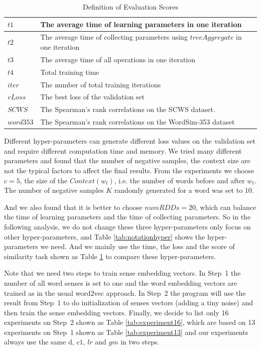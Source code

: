 \begin{table}[tb]
	\caption{Definition of Evaluation Scores } \label{tab:notationevalution}
	\begin{center}
		\begin{tabular}{|l|l|}
			\hline 
			$t1$ & The average time of learning parameters in one iteration  \\ \hline
			$t2$ & The average time of collecting parameters using $treeAggregate$ in one iteration \\ \hline
			
			$t3$ &The average time of all operations in one iteration \\ \hline
			
			$t4$ & Total training time \\ \hline
			$iter$ & The number of total training iterations \\ \hline
			$vLoss$ & The best loss of the validation set \\ \hline
			$SCWS$ & The Spearman’s rank correlations on the SCWS dataset. 
			\\ \hline
			$word353$ & The Spearman’s rank correlations on the WordSim-353 dataset \\ \hline
			
		\end{tabular}
	\end{center}
\end{table}

Different hyper-parameters can generate different loss values on the validation set and require different computation time and memory. We tried many different parameters and found that the number of negative samples, the context size are not the typical factors to affect the final results. From the experiments we choose $c=5$, the size of the $Context(w_t)$, i.e. the number of words before and after $w_t$.
The number of negative samples $K$ randomly generated for a word was set to $10$.

And we also found that it is better to choose $numRDDs = 20$, which can balance the time of learning parameters and the time of collecting parameters. So in the following analysis, we do not change these three hyper-parameters only focus on other hyper-parameters, and Table \ref{tab:notationhyper} shows the hyper-parameters we need. And we mainly use the time, the loss and the score of similarity task shown as Table \ref{tab:notationevalution} to compare these hyper-parameters. 

Note that we need two steps to train sense embedding vectors. In Step~1 the number of all word senses is set to one and the word embedding vectors are trained as in the usual word2vec approach. In Step~2 the program will use the result from Step~1 to do initialization of senses vectors (adding a tiny noise) and then train the sense embedding vectors. Finally, we decide to list only 16 experiments on Step~2 shown as Table \ref{tab:experiment16}, which are based on 13 experiments on Step~1 shown as Table \ref{tab:experiment13} and our experiments always use the same \gls{d}, $c1$, $lr$ and $gm$ in two steps. 

